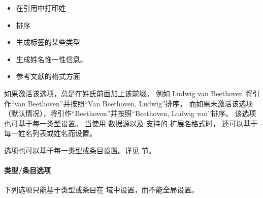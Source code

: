 \begin{optionlist}
\begin{itemize}
\item %
在引用中打印姓
\item %
排序
\item %
生成标签的某些类型
\item %
生成姓名惟一性信息。
\item %
参考文献的格式方面
\end{itemize}
%
如果激活该选项，\biblatex 总是在姓氏前面加上该前缀。
例如 Ludwig van Beethoven 将引作“van Beethoven”并按照“Van Beethoven, Ludwig”排序，
而如果未激活该选项（默认情况），将引作“Beethoven”并按照“Beethoven, Ludwig van”排序。
该选项也可基于每一类型设置。
当使用 \biblatexml 数据源以及 \biber 支持的 \BibTeX 扩展名格式时，
还可以基于每一姓名列表或姓名而设置。


 选项也可以基于每一类型或条目设置。详见  节。

\end{optionlist}

\paragraph{类型/条目选项}%
\label{use:opt:bib:ded}

下列选项只能基于类型或条目在  域中设置，而不能全局设置。

